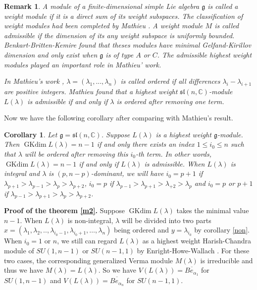 \documentclass{amsart}[12pt]
\newtheorem{Cor}{Corollary}[section]
\newtheorem{Rem}{Remark}[section]
\newcommand{\gkd}{\operatorname{GKdim}}
\numberwithin{equation}{section}
\begin{document}
\begin{Rem}
A module of a finite-dimensional simple Lie algebra $\mathfrak{g}$ is called a
\emph{weight module} if it is a direct sum of its weight subspaces. The classification of weight modules had been completed by Mathieu \cite{Ma}.
A weight module $M$ is called \emph{admissible} if the dimension of its any weight subspace is uniformly bounded. Benkart-Britten-Kemire \cite{BBL}  found that theses modules have minimal Gelfand-Kirillov dimension and only exist when $\mathfrak{g}$ is of type $A$ or $C$.
The admissible highest weight modules played an important role in Mathieu' work.



In Mathieu's work \cite{Ma}, $\lambda=(\lambda_1,...,\lambda_n)$ is called \emph{ordered} if all differences $\lambda_i-\lambda_{i+1}$ are positive integers.
Mathieu found that a highest weight $\mathfrak{sl}(n, \mathbb{C})$-module $L(\lambda)$ is admissible if and only if $\lambda$ is ordered after removing one term.
\end{Rem}

Now we have the following corollary after comparing with Mathieu's result.
\begin{Cor}
Let $ \mathfrak{g}=\mathfrak{sl}(n,\mathbb{C}) $. Suppose $L(\lambda)$ is a  highest weight $\mathfrak{g}$-module. Then   $\gkd L(\lambda)=n-1$  if and only   there exists an  index $1\leq i_0\leq n$ such that  $\lambda$ will be ordered after removing this $i_0$-th  term.
In other words, $\gkd L(\lambda)=n-1$  if and only if $L(\lambda)$ is admissible. When $L(\lambda)$ is integral and $\lambda$ is  $ (p,n-p) $-dominant, we will have $i_0=p+1$ if $\lambda_{p+1}>\lambda_{p-1}>\lambda_p>\lambda_{p+2}$, $i_0=p$ if $\lambda_{p-1}>\lambda_{p+1}>\lambda_{+2}>\lambda_{p}$ and $i_0=p$ or $p+1$ if $\lambda_{p-1}>\lambda_{p+1}>\lambda_p>\lambda_{p+2}$.
\end{Cor}

{\bf Proof of the theorem \ref{m2}.}
Suppose $\gkd L(\lambda)$ takes the minimal value $n-1$. When $L(\lambda)$ is non-integral,
 $\lambda$ will be divided into two parts $x=(\lambda_1,\lambda_2,..,\lambda_{i_0-1},\lambda_{i_0+1},\dots,\lambda_n)$ being ordered and $y=\lambda_{i_0}$ by corollary \ref{non}. When $i_0=1$ or $n$, we still can regard $L(\lambda)$ as a highest weight Harish-Chandra module of $SU(1,n-1)$ or $SU(n-1,1)$ by Enright-Howe-Wallach \cite{EHW}. For these two cases, the corresponding generalized Verma module $M(\lambda)$ is irreducible and thus we have $M(\lambda)=L(\lambda)$. So we have $V( L(\lambda))=\overline{Be_{\alpha_{1}}}$ for $SU(1,n-1)$ and  $V( L(\lambda))=\overline{Be_{\alpha_{n}}}$ for $SU(n-1,1)$.
\end{document}
